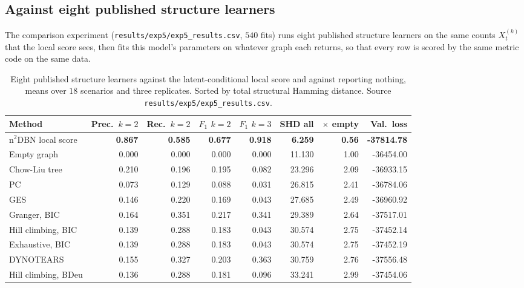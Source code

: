 \subsection{Against eight published structure learners}
\label{sec:results:comparison}

The comparison experiment (\texttt{results/exp5/exp5\_results.csv}, $540$ fits)
runs eight published structure learners on the same counts $X_t^{(k)}$ that
the local score sees, then fits this model's parameters on whatever graph each
returns, so that every row is scored by the same metric code on the same data.

\begin{table}[t]
\centering
\caption{Eight published structure learners against the latent-conditional
local score and against reporting nothing, means over $18$ scenarios and three
replicates. Sorted by total structural Hamming distance. Source
\texttt{results/exp5/exp5\_results.csv}.}
\label{tab:results:comparison}
\small
\begin{tabular}{lrrrrrrr}
\toprule
Method & Prec.\ $k{=}2$ & Rec.\ $k{=}2$ & $F_1$ $k{=}2$ & $F_1$ $k{=}3$ & SHD all & $\times$ empty & Val.\ loss \\
\midrule
n$^2$DBN local score & \textbf{0.867} & \textbf{0.585} & \textbf{0.677} & \textbf{0.918} & \textbf{6.259} & \textbf{0.56} & \textbf{-37814.78} \\
Empty graph          & 0.000 & 0.000 & 0.000 & 0.000 & 11.130 & 1.00 & -36454.00 \\
Chow-Liu tree        & 0.210 & 0.196 & 0.195 & 0.082 & 23.296 & 2.09 & -36933.15 \\
PC                   & 0.073 & 0.129 & 0.088 & 0.031 & 26.815 & 2.41 & -36784.06 \\
GES                  & 0.146 & 0.220 & 0.169 & 0.043 & 27.685 & 2.49 & -36960.92 \\
Granger, BIC         & 0.164 & 0.351 & 0.217 & 0.341 & 29.389 & 2.64 & -37517.01 \\
Hill climbing, BIC   & 0.139 & 0.288 & 0.183 & 0.043 & 30.574 & 2.75 & -37452.14 \\
Exhaustive, BIC      & 0.139 & 0.288 & 0.183 & 0.043 & 30.574 & 2.75 & -37452.19 \\
DYNOTEARS            & 0.155 & 0.327 & 0.203 & 0.363 & 30.759 & 2.76 & -37556.48 \\
Hill climbing, BDeu  & 0.136 & 0.288 & 0.181 & 0.096 & 33.241 & 2.99 & -37454.06 \\
\bottomrule
\end{tabular}
\end{table}

